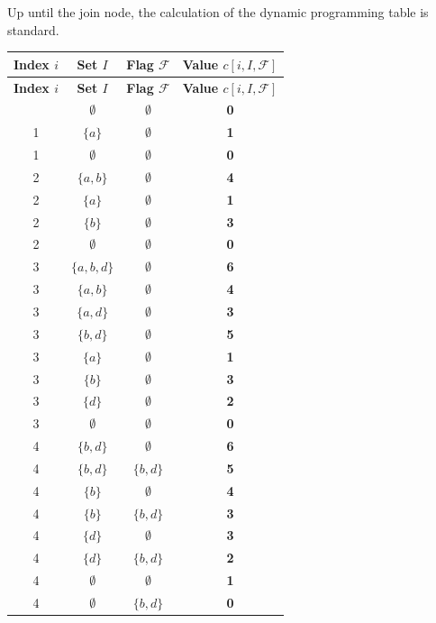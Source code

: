 Up until the join node, the calculation of the dynamic programming table is standard.

\begin{minipage}[t]{0.48\textwidth} %
    \centering
    \begin{longtable}{|c|c|c|c|}
        \hline
        \textbf{Index $i$} & \textbf{Set $I$} & \textbf{Flag $\mathcal{F}$} & \textbf{Value $c[i, I, \mathcal{F}]$} \\
        \hline
        \endfirsthead
        \hline
        \textbf{Index $i$} & \textbf{Set $I$} & \textbf{Flag $\mathcal{F}$} & \textbf{Value $c[i, I, \mathcal{F}]$} \\
        \hline
        \endhead
        \hline
        \endfoot

        \hline
        0 & $\emptyset$ & $\emptyset$ & \textbf{0} \\
        \hline
        1 & $\{a\}$ & $\emptyset$ & \textbf{1} \\
        1 & $\emptyset$ & $\emptyset$ & \textbf{0} \\
        \hline
        2 & $\{a,b\}$ & $\emptyset$ & \textbf{4} \\
        2 & $\{a\}$ & $\emptyset$ & \textbf{1} \\
        2 & $\{b\}$ & $\emptyset$ & \textbf{3} \\
        2 & $\emptyset$ & $\emptyset$ & \textbf{0} \\
        \hline
        3 & $\{a,b,d\}$ & $\emptyset$ & \textbf{6} \\
        3 & $\{a,b\}$ & $\emptyset$ & \textbf{4} \\
        3 & $\{a,d\}$ & $\emptyset$ & \textbf{3} \\
        3 & $\{b,d\}$ & $\emptyset$ & \textbf{5} \\
        3 & $\{a\}$ & $\emptyset$ & \textbf{1} \\
        3 & $\{b\}$ & $\emptyset$ & \textbf{3} \\
        3 & $\{d\}$ & $\emptyset$ & \textbf{2} \\
        3 & $\emptyset$ & $\emptyset$ & \textbf{0} \\
        \hline
        4 & $\{b,d\}$ & $\emptyset$ & \textbf{6} \\
        4 & $\{b,d\}$ & $\{b,d\}$ & \textbf{5} \\
        4 & $\{b\}$ & $\emptyset$ & \textbf{4} \\
        4 & $\{b\}$ & $\{b,d\}$ & \textbf{3} \\
        4 & $\{d\}$ & $\emptyset$ & \textbf{3} \\
        4 & $\{d\}$ & $\{b,d\}$ & \textbf{2} \\
        4 & $\emptyset$ & $\emptyset$ & \textbf{1} \\
        4 & $\emptyset$ & $\{b,d\}$ & \textbf{0} \\
        \hline
    \end{longtable}
\end{minipage}%
